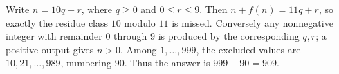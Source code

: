 Write $n=10q+r$, where $q\ge0$ and $0\le r\le9$. Then $n+f(n)=11q+r$, so exactly the residue class $10$ modulo $11$ is missed. Conversely any nonnegative integer with remainder $0$ through $9$ is produced by the corresponding $q,r$; a positive output gives $n>0$. Among $1,\ldots,999$, the excluded values are $10,21,\ldots,989$, numbering $90$. Thus the answer is $\boxed{999-90=909}$.

